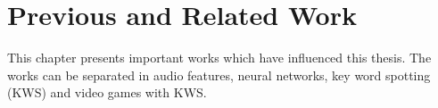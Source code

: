 
\chapter{Previous and Related Work}\label{sec:prev}
This chapter presents important works which have influenced this thesis.
The works can be separated in audio features, neural networks, key word spotting (KWS) and video games with KWS.







